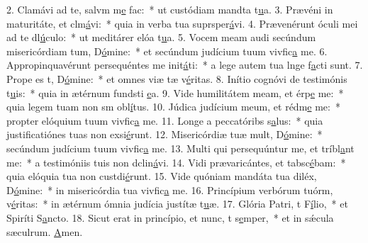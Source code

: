 2. Clamávi ad te, salvm m\uline{e} fac:~* ut custódiam mandta t\uline{u}a.
3. Prævéni in maturitáte, et clm\uline{á}vi:~* quia in verba tua suprsper\uline{á}vi.
4. Prævenérunt óculi mei ad te dl\uline{ú}culo:~* ut meditárer elóa t\uline{u}a.
5. Vocem meam audi secúndum misericórdiam tum, D\uline{ó}mine:~* et secúndum judícium tuum vivfic\uline{a} me.
6. Appropinquavérunt persequéntes me init\uline{á}ti:~* a lege autem tua lnge f\uline{a}cti sunt.
7. Prope es t, D\uline{ó}mine:~* et omnes viæ tæ v\uline{é}ritas.
8. Inítio cognóvi de testimónis t\uline{u}is:~* quia in ætérnum fundsti \uline{e}a.
9. Vide humilitátem meam, et érp\uline{e} me:~* quia legem tuam non sm obl\uline{í}tus.
10. Júdica judícium meum, et rédm\uline{e} me:~* propter elóquium tuum vivfic\uline{a} me.
11. Longe a peccatóribs s\uline{a}lus:~* quia justificatiónes tuas non exsi\uline{é}runt.
12. Misericórdiæ tuæ mult, D\uline{ó}mine:~* secúndum judícium tuum vivfic\uline{a} me.
13. Multi qui persequúntur me, et tríbl\uline{a}nt me:~* a testimóniis tuis non dclin\uline{á}vi.
14. Vidi prævaricántes, et tabsc\uline{é}bam:~* quia elóquia tua non custdi\uline{é}runt.
15. Vide quóniam mandáta tua diléx, D\uline{ó}mine:~* in misericórdia tua vivfic\uline{a} me.
16. Princípium verbórum tuórm, v\uline{é}ritas:~* in ætérnum ómnia judícia justítæ t\uline{u}æ.
17. Glória Patri, t F\uline{í}lio,~* et Spiríti S\uline{a}ncto.
18. Sicut erat in princípio, et nunc, t s\uline{e}mper,~* et in sǽcula sæculrum. \uline{A}men.
